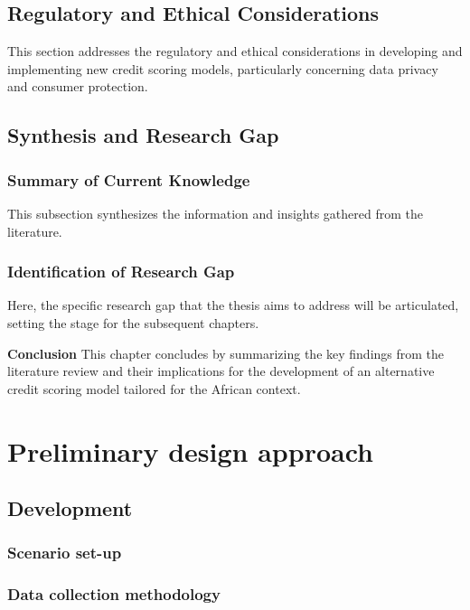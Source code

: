 \documentclass[a4paper,11pt,fleqn]{report}
\begin{document}
\section{Regulatory and Ethical Considerations}
This section addresses the regulatory and ethical considerations in developing and implementing new credit scoring models, particularly concerning data privacy and consumer protection.

\section{Synthesis and Research Gap}
\subsection{Summary of Current Knowledge}
This subsection synthesizes the information and insights gathered from the literature.
\subsection{Identification of Research Gap}
Here, the specific research gap that the thesis aims to address will be articulated, setting the stage for the subsequent chapters.

\textbf{Conclusion}
This chapter concludes by summarizing the key findings from the literature review and their implications for the development of an alternative credit scoring model tailored for the African context.

\chapter{Preliminary design approach}



\section{Development}



\subsection{Scenario set-up}



\subsection{Data collection methodology} 


 
\end{document}
